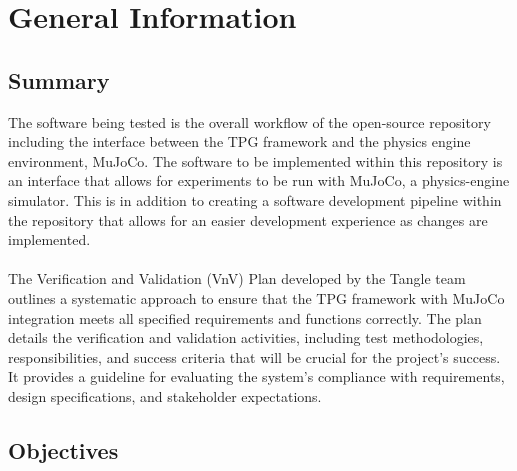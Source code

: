 \documentclass[12pt, titlepage]{article}
\begin{document}
\section{General Information}

\subsection{Summary}


The software being tested is the overall workflow of the open-source repository including the interface between the TPG framework and the physics engine environment, MuJoCo.
The software to be implemented within this repository is an interface that allows for experiments to be run with MuJoCo, a physics-engine simulator. This is in addition to creating a software development pipeline within the repository that allows for an easier development experience as changes are implemented. \\\\

The Verification and Validation (VnV) Plan developed by the Tangle team outlines a systematic approach to ensure that the TPG framework with MuJoCo integration meets all specified requirements and functions correctly. The plan details the verification and validation activities, including test methodologies, responsibilities, and success criteria that will be crucial for the project's success. It provides a guideline for evaluating the system's compliance with requirements, design specifications, and stakeholder expectations.


\subsection{Objectives}


\end{document}
